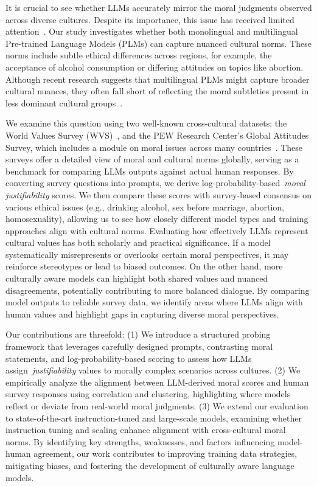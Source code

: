 \documentclass[11pt]{article}
\begin{document}
It is crucial to see whether LLMs accurately mirror the moral judgments observed across diverse cultures. Despite its importance, this issue has received limited attention~\citep{arora2023probing, liu2024multilingual}. Our study investigates whether both monolingual and multilingual Pre-trained Language Models (PLMs) can capture nuanced cultural norms. These norms include subtle ethical differences across regions, for example, the acceptance of alcohol consumption or differing attitudes on topics like abortion. Although recent research suggests that multilingual PLMs might capture broader cultural nuances, they often fall short of reflecting the moral subtleties present in less dominant cultural groups~\citep{Hmmerl2022, papadopoulou2024}.

We examine this question using two well-known cross-cultural datasets: the World Values Survey (WVS)~\citep{Inglehart2014, Haerpfer2022}, and the PEW Research Center’s Global Attitudes Survey, which includes a module on moral issues across many countries~\citep{Pew2023}. These surveys offer a detailed view of moral and cultural norms globally, serving as a benchmark for comparing LLMs outputs against actual human responses. By converting survey questions into prompts, we derive log-probability-based~\emph{moral justifiability} scores. We then compare these scores with survey-based consensus on various ethical issues (e.g., drinking alcohol, sex before marriage, abortion, homosexuality), allowing us to see how closely different model types and training approaches align with cultural norms. Evaluating how effectively LLMs represent cultural values has both scholarly and practical significance. If a model systematically misrepresents or overlooks certain moral perspectives, it may reinforce stereotypes or lead to biased outcomes. On the other hand, more culturally aware models can highlight both shared values and nuanced disagreements, potentially contributing to more balanced dialogue. By comparing model outputs to reliable survey data, we identify areas where LLMs align with human values and highlight gaps in capturing diverse moral perspectives.

Our contributions are threefold: (1) We introduce a structured probing framework that leverages carefully designed prompts, contrasting moral statements, and log-probability-based scoring to assess how LLMs assign~\emph{justifiability} values to morally complex scenarios across cultures. (2) We empirically analyze the alignment between LLM-derived moral scores and human survey responses using correlation and clustering, highlighting where models reflect or deviate from real-world moral judgments. (3) We extend our evaluation to state-of-the-art instruction-tuned and large-scale models, examining whether instruction tuning and scaling enhance alignment with cross-cultural moral norms. By identifying key strengths, weaknesses, and factors influencing model-human agreement, our work contributes to improving training data strategies, mitigating biases, and fostering the development of culturally aware language models. 
\end{document}
